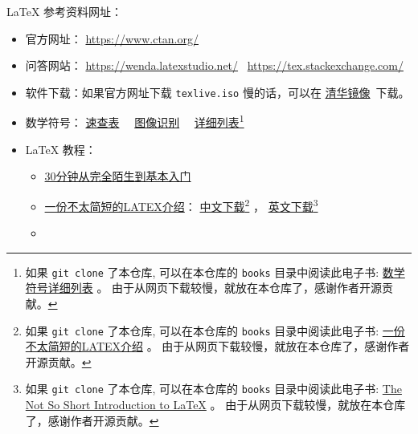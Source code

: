 \documentclass[
    11pt,
    base=hide,
    cite=authoryear,
    device=phone,
    lang=cn,
    mode=simple,
    result=answer,
    toc=onecol,
]{elegantbook_sierxue}
\begin{document}
\LaTeX{} 参考资料网址：
\begin{itemize}
    \item 官方网址： \href{https://www.ctan.org/}{https://www.ctan.org/}
    \item 问答网站：
        \href{https://wenda.latexstudio.net/}{https://wenda.latexstudio.net/}~%
        \href{https://tex.stackexchange.com/}{https://tex.stackexchange.com/}
    \item 软件下载：如果官方网址下载 \lstinline{texlive.iso} 慢的话，可以在
    \href{https://mirrors.tuna.tsinghua.edu.cn/CTAN/systems/texlive/Images/}
                {清华镜像}~下载。
    \item 数学符号： \href{books/latex-math-symbols.pdf}{速查表}~~%
        \href{http://detexify.kirelabs.org/classify.html} {图像识别}~~%
        \href{http://mirrors .ustc.edu.cn/CTAN/info/symbols/comprehensive/symbols-a4.pdf}
        {详细列表}\footnote{
            如果 \lstinline{git clone} 了本仓库,
            可以在本仓库的 \lstinline{books}
            目录中阅读此电子书:
            \href{books/symbols-a4.pdf}{数学符号详细列表} 。
            由于从网页下载较慢，就放在本仓库了，感谢作者开源贡献。
            }
    \item \LaTeX{} 教程：
        \begin{itemize}
            \item \href{https://www.latexstudio.net/archives/9377.html}
                {30分钟从完全陌生到基本入门}
            \item
                \href{https://www.ctan.org/tex-archive/info/lshort/chinese}
                {一份不太简短的LATEX介绍}：
        \href{http://mirrors.ctan.org/info/lshort/chinese/lshort-zh-cn.pdf}
                {中文下载}\footnote{
                    如果 \lstinline{git clone} 了本仓库,
                    可以在本仓库的 \lstinline{books}
                    目录中阅读此电子书:
                    \href{books/lshort-zh-cn.pdf}{一份不太简短的LATEX介绍} 。
                    由于从网页下载较慢，就放在本仓库了，感谢作者开源贡献。
                    }
                ，
        \href{http://mirrors.ctan.org/info/lshort/english/lshort.pdf}
                {英文下载}\footnote{
                    如果 \lstinline{git clone} 了本仓库,
                    可以在本仓库的 \lstinline{books}
                    目录中阅读此电子书:
                    \href{books/lshort.pdf}
                    {The Not So Short Introduction to LaTeX} 。
                    由于从网页下载较慢，就放在本仓库了，感谢作者开源贡献。
                    }
            \item

\end{itemize}
\end{itemize}
\end{document}
